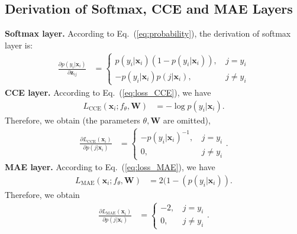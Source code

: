 \documentclass{article}
\begin{document}
\subsection{Derivation of Softmax, CCE and MAE Layers}
\noindent
\textbf{Softmax layer.} According to Eq.~(\ref{eq:probability}), the derivation of softmax layer is:
\begin{equation}
	\label{eq:both_prob_derivation_final_MainPaper}
	\begin{aligned}
		\frac{\partial p(y_i|\mathbf{x}_i)}{\partial \mathbf{z}_{ij}} 
		&=
		\begin{cases} 
			p(y_i|\mathbf{x}_i) 
			(1-p(y_i|\mathbf{x}_i))
			\text{, } &j = y_i  \\
			-p(y_i|\mathbf{x}_i) 
			p(j|\mathbf{x}_i)  
			\text{, } &j \neq y_i
		\end{cases}
	\end{aligned}
\end{equation}
\noindent
\textbf{CCE layer.} According to Eq.~(\ref{eq:loss_CCE}), 
we have
\begin{equation}
	\label{eq:loss_CCE_x_i}
	\begin{aligned}
		L_{\mathrm{CCE}} (\mathbf{x}_i;f_\theta,\mathbf{W}) 
&= 	- \log p(y_i|\mathbf{x}_i)
		.
	\end{aligned}
\end{equation}
Therefore, we obtain (the parameters $\theta, \mathbf{W}$ are omitted),   
\begin{equation}
	\label{eq:derivation_CCE_x_i_MainPaper}
	\begin{aligned}
		\frac{\partial L_{\mathrm{CCE}}(\mathbf{x}_i)}{\partial p(j|\mathbf{x}_i)} 
		&=
		\begin{cases} 
-p(y_i|\mathbf{x}_i)^{-1} 
			\text{, } &j = y_i  \\
			0       
			\text{, } &j \neq y_i
		\end{cases}
		.
	\end{aligned}
\end{equation}
\noindent
\textbf{MAE layer.} According to Eq.~(\ref{eq:loss_MAE}), 
we have
\begin{equation}
	\label{eq:loss_MAE_x_i}
	\begin{aligned}
		L_{\mathrm{MAE}} (\mathbf{x}_i;f_\theta,\mathbf{W}) 
&= 	2(1- (p(y_i|\mathbf{x}_i))
		.
	\end{aligned}
\end{equation}
Therefore, we obtain \begin{equation}
	\label{eq:derivation_MAE_x_i_MainPaper}
	\begin{aligned}
		\frac{\partial L_{\mathrm{MAE}}(\mathbf{x}_i)}{\partial p(j|\mathbf{x}_i)} 
		&=
		\begin{cases} 
			-2  \text{, } &j = y_i  \\
			0        \text{, } &j \neq y_i
		\end{cases}
		.
	\end{aligned}
\end{equation}
\end{document}
